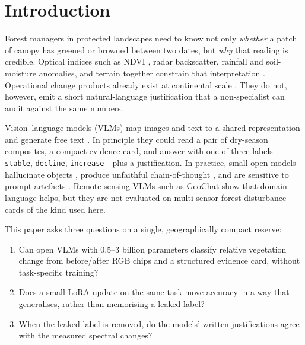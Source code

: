\documentclass[11pt]{article}
\begin{document}

\section{Introduction}

Forest managers in protected landscapes need to know not only
\emph{whether} a patch of canopy has greened or browned between two
dates, but \emph{why} that reading is credible. Optical indices such as
NDVI \citep{rouse1974,tucker1979}, radar backscatter, rainfall and
soil-moisture anomalies, and terrain together constrain that
interpretation \citep{lillesand2015}. Operational change products
already exist at continental scale \citep{hansen2013,kennedy2010,zhu2014}.
They do not, however, emit a short natural-language justification that
a non-specialist can audit against the same numbers.

Vision--language models (VLMs) map images and text to a shared
representation and generate free text
\citep{liu2023llava,wang2024qwen2vl,beyer2024,li2023blip2}. In
principle they could read a pair of dry-season composites, a compact
evidence card, and answer with one of three labels---\texttt{stable},
\texttt{decline}, \texttt{increase}---plus a justification. In
practice, small open models hallucinate objects \citep{li2023pope},
produce unfaithful chain-of-thought \citep{turpin2023,jacovi2020}, and
are sensitive to prompt artefacts \citep{zhao2021calibrate}. Remote-sensing
VLMs such as GeoChat \citep{kuckreja2024} show that domain language
helps, but they are not evaluated on multi-sensor forest-disturbance
cards of the kind used here.

This paper asks three questions on a single, geographically compact
reserve:

\begin{enumerate}
\item Can open VLMs with 0.5--3 billion parameters classify relative
vegetation change from before/after RGB chips and a structured evidence
card, without task-specific training?
\item Does a small LoRA update \citep{hu2022lora} on the same task
move accuracy in a way that generalises, rather than memorising a
leaked label?
\item When the leaked label is removed, do the models' written
justifications agree with the measured spectral changes?
\end{enumerate}
\end{document}
